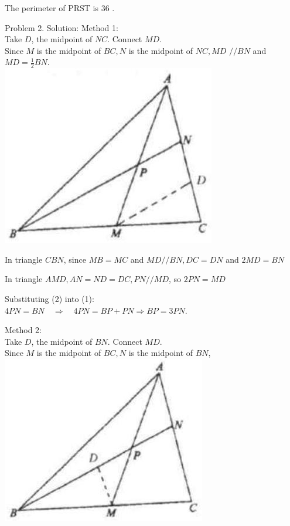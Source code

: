 \documentclass[10pt]{article}
\begin{document}
The perimeter of PRST is 36 .

Problem 2. Solution:
Method 1:\\
Take \(D\), the midpoint of \(N C\). Connect \(M D\).\\
Since \(M\) is the midpoint of \(B C, N\) is the midpoint of \(N C, M D\) \(/ / B N\) and \(M D=\frac{1}{2} B N\).\\
\includegraphics[max width=\textwidth, center]{2025_04_17_97bc1f7e44d93c271a88g-047}

In triangle \(C B N\), since \(M B=M C\) and \(M D / / B N, D C=D N\) and \(2 M D=B N\)

In triangle \(A M D, A N=N D=D C, P N / / M D\), so \(2 P N=M D\)

Substituting (2) into (1):\\
\(4 P N=B N \quad \Rightarrow \quad 4 P N=B P+P N \Rightarrow B P=3 P N\).

Method 2:\\
Take \(D\), the midpoint of \(B N\). Connect \(M D\).\\
Since \(M\) is the midpoint of \(B C, N\) is the midpoint of \(B N\),\\
\includegraphics[max width=\textwidth, center]{2025_04_17_97bc1f7e44d93c271a88g-047(1)}
\end{document}
